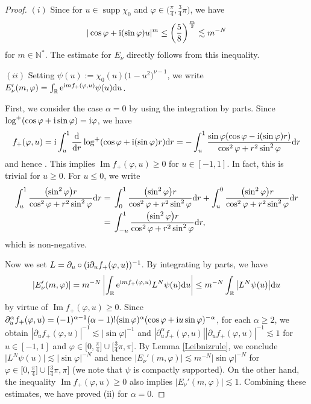 \documentclass[10pt,a4paper]{amsart}
\numberwithin{equation}{section}
\def\R{\mathbb{R}}%
\DeclareMathOperator{\supp}{supp}%
\DeclareMathOperator{\im}{Im}%
\def\a{\alpha}
\def\f{\varphi}
\def\g{\psi}
\def\n{\nu}
\def\pa{\partial}
\begin{document}
\begin{proof}
 $(i)$ Since \smash{$|\cos\f+{\rm i}(\sin \f)u|\leq \sqrt{\frac{5}{8}}$} for $u\in \supp \chi_0$ and $\f\in \bigl(\frac{\pi}{4}, \frac{3}{4}\pi\bigr)$, we have
 \[
|\cos\f+{\rm i}(\sin \f)u|^m\leq \left(\frac{5}{8}\right)^{\frac{m}{2}}\lesssim m^{-N}
\]
 for $m\in\mathbb{N}^*$. The estimate for $E_{\n}$ directly follows from this inequality.

 $(ii)$ Setting $\g(u):=\chi_0(u)\bigl(1-u^2\bigr)^{\n-1}$, we write $E_{\n}'(m,\f)=\int_{\R}{\rm e}^{{\rm i}mf_{+}(\f,u)}\g(u){\rm d}u$.

First, we consider the case $\a=0$ by using the integration by parts.
Since $\log^+(\cos \f+{\rm i}\sin \f)={\rm i}\f$, we have
\begin{align}\label{f_+rep}
f_+(\f,u)={\rm i}\int_u^1\frac{{\rm d}}{{\rm d}r}\log^+(\cos \f+{\rm i}(\sin \f) r){\rm d}r=-\int_u^1\frac{\sin\f(\cos \f-{\rm i}(\sin \f) r)}{\cos^2 \f+r^2\sin^2 \f }{\rm d}r
\end{align}
and hence \smash{$\im f_+(\f,u)=\int_u^1\frac{(\sin^2 \f) r}{\cos^2 \f+r^2\sin^2 \f }{\rm d}r$}. This implies $\im f_+(\f,u)\geq 0$ for $u\in [-1,1]$. In fact, this is trivial for $u\geq 0$. For $u\leq 0$, we write
\begin{align*}
\int_u^1\frac{\bigl(\sin^2 \f\bigr) r}{\cos^2 \f+r^2\sin^2 \f }{\rm d}r={}&\int_0^1\frac{\bigl(\sin^2 \f\bigr) r}{\cos^2 \f+r^2\sin^2 \f }{\rm d}r+\int_u^0\frac{\bigl(\sin^2 \f\bigr) r}{\cos^2 \f+r^2\sin^2 \f }{\rm d}r\\
={}&\int_{-u}^1\frac{\bigl(\sin^2 \f\bigr) r}{\cos^2 \f+r^2\sin^2 \f }{\rm d}r,
\end{align*}
 which is non-negative.

Now we set $L=\pa_u\circ ({\rm i}\pa_uf_+(\f,u))^{-1}$. By integrating by parts, we have
\[
|E_{\n}'(m,\f)|=m^{-N}\left|\int_{\R}{\rm e}^{{\rm i}mf_{+}(\f,u)} L^N\g(u){\rm d}u\right|\leq m^{-N}\int_{\R}\big| L^N\g(u)\big|{\rm d}u
\]
 by virtue of $\im f_+(\f,u)\geq 0$. Since $\pa_u^{\a}f_+(\f,u)=(-1)^{\a-1}(\a-1)!(\sin\f)^{\a}(\cos \f+{\rm i}u\sin \f )^{-\a}$, for each $\a\geq 2$, we obtain $|\pa_uf_+(\f,u)|^{-1}\lesssim |\sin \f|^{-1}$ and $|\pa_u^{\a}f_+(\f,u)||\pa_uf_+(\f,u)|^{-1} \lesssim 1$ for $u\in [-1,1]$ and $\f\in \bigl[0,\frac{\pi}{4}\bigr]\cup \bigl[\frac{3}{4}\pi,\pi\bigr]$. By Lemma \ref{Leibnizrule}, we conclude $\big| L^N\g(u)\big|\lesssim |\sin\f|^{-N}$ and hence $|E_{\n}'(m,\f)|\lesssim m^{-N}|\sin\f|^{-N}$ for $\f\in \bigl[0,\frac{\pi}{4}\bigr]\cup \bigl[\frac{3}{4}\pi,\pi\bigr]$ (we note that $\g$ is compactly supported). On the other hand, the inequality $\im f_+(\f,u)\geq 0$ also implies $|E_{\n}'(m,\f)|\lesssim 1$. Combining these estimates, we have proved (ii) for $\a=0$.


\end{proof}
\end{document}
